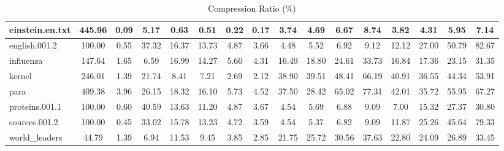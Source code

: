 \begin{table}[]
\begin{tabular}{|l|c|c|c|c|c|c|c|c|c|c|c|c|c|c|c|}
\hline
einstein.en.txt & 445.96 & 0.09 & 5.17 & 0.63 & 0.51 & 0.22 & 0.17 & 3.74 & 4.69 & 6.67 & 8.74 & 3.82 & 4.31 & 5.95 & 7.14 \\
\hline
english.001.2 & 100.00 & 0.55 & 37.32 & 16.37 & 13.73 & 4.87 & 3.66 & 4.48 & 5.52 & 6.92 & 9.12 & 12.12 & 27.00 & 50.79 & 82.67 \\
\hline
influenza & 147.64 & 1.65 & 6.59 & 16.99 & 14.27 & 5.66 & 4.31 & 16.49 & 18.80 & 24.61 & 33.73 & 16.84 & 17.36 & 23.15 & 31.35 \\
\hline
kernel & 246.01 & 1.39 & 21.74 & 8.41 & 7.21 & 2.69 & 2.12 & 38.90 & 39.51 & 48.41 & 66.19 & 40.91 & 36.55 & 44.34 & 53.91 \\
\hline
para & 409.38 & 3.96 & 26.15 & 18.32 & 16.10 & 5.73 & 4.52 & 37.50 & 28.42 & 65.02 & 77.31 & 42.01 & 35.72 & 55.95 & 67.27 \\
\hline
proteins.001.1 & 100.00 & 0.60 & 40.59 & 13.63 & 11.20 & 4.87 & 3.67 & 4.54 & 5.69 & 6.88 & 9.09 & 7.00 & 15.32 & 27.37 & 30.80 \\
\hline
sources.001.2 & 100.00 & 0.45 & 33.02 & 15.78 & 13.23 & 4.72 & 3.59 & 4.54 & 5.37 & 6.82 & 9.09 & 11.87 & 25.26 & 45.64 & 79.33 \\
\hline
world\_leaders & 44.79 & 1.39 & 6.94 & 11.53 & 9.45 & 3.85 & 2.85 & 21.75 & 25.72 & 30.56 & 37.63 & 22.80 & 24.09 & 26.89 & 33.45 \\
\hline
\end{tabular}
\caption{Compression Ratio (\%)}
\label{tab:compression_ratio}
\end{table}
